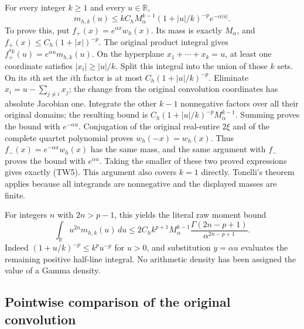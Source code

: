 \documentclass[11pt,a4paper]{article}
\begin{document}
For every integer $k\geq1$ and every $u\in\mathbb R$,
\[
 \boxed{m_{h,k}(u)\leq
 kC_hM_\alpha^{k-1}(1+|u|/k)^{-p}e^{-\alpha|u|}.}
 \tag{TW5}
\]
To prove this, put $f_+(x)=e^{\alpha x}w_h(x)$.  Its mass is exactly
$M_\alpha$, and $f_+(x)\leq C_h(1+|x|)^{-p}$.  The original product
integral gives $f_+^{*k}(u)=e^{\alpha u}m_{h,k}(u)$.
On the hyperplane $x_1+\cdots+x_k=u$, at least one coordinate satisfies
$|x_i|\geq|u|/k$.  Split this integral into the union of those $k$ sets.
On its $i$th set the $i$th factor is at most
$C_h(1+|u|/k)^{-p}$.  Eliminate $x_i=u-\sum_{j\ne i}x_j$; the change
from the original convolution coordinates has absolute Jacobian one.
Integrate the other $k-1$ nonnegative factors over all their original
domains; the resulting bound is
$C_h(1+|u|/k)^{-p}M_\alpha^{k-1}$.
Summing proves the bound with $e^{-\alpha u}$.
Conjugation of the original real-entire $2\xi$ and of the complete
quartet polynomial proves $w_h(-x)=w_h(x)$.  Thus
$f_-(x)=e^{-\alpha x}w_h(x)$ has the same mass, and the same argument
with $f_-$ proves the bound with $e^{\alpha u}$.  Taking the smaller
of these two proved expressions gives exactly (TW5).  This argument
also covers $k=1$ directly.  Tonelli's theorem applies because all
integrands are nonnegative and the displayed masses are finite.

For integers $n$ with $2n>p-1$, this yields the literal raw moment bound
\[
 \int_{\mathbb R}u^{2n}m_{h,k}(u)\,du
 \leq 2C_h k^{p+1}M_\alpha^{k-1}
 \frac{\Gamma(2n-p+1)}{\alpha^{2n-p+1}}.
 \tag{TW6}
\]
Indeed $(1+u/k)^{-p}\leq k^pu^{-p}$ for $u>0$, and substitution
$y=\alpha u$ evaluates the remaining positive half-line integral.
No arithmetic density has been assigned the value of a Gamma density.

\subsection{Pointwise comparison of the original convolution}
\end{document}
